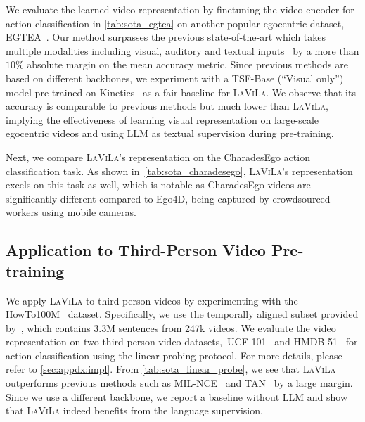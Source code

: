 \documentclass[10pt,twocolumn,letterpaper]{article}
\newcommand{\myparagraph}[1]{\vspace{0pt}\noindent{\bf #1}}
\newcommand{\ours}{\textsc{LaViLa}\xspace}
\newcommand{\charadesego}{CharadesEgo\xspace}
\begin{document}
\myparagraph{EGTEA.}
We evaluate the learned video representation by finetuning the video encoder for action classification in \cref{tab:sota_egtea} on another popular egocentric dataset, EGTEA~\cite{li2018egtea}.
Our method surpasses the previous state-of-the-art which takes multiple modalities including visual, auditory and textual inputs~\cite{kazakos2021little} by a more than $10\%$ absolute margin on the mean accuracy metric.
Since previous methods are based on different backbones, we experiment with a TSF-Base (``Visual only'') model pre-trained on Kinetics~\cite{carreira2017i3d} as a fair baseline for \ours.
We observe that its accuracy is comparable to previous methods but much lower than \ours, implying the effectiveness of learning visual representation on large-scale egocentric videos and using LLM as textual supervision during pre-training.



\myparagraph{\charadesego.} Next, we compare \ours's representation on the \charadesego action classification task. As shown in~\cref{tab:sota_charadesego}, \ours's representation excels on this task as well, which is notable as CharadesEgo videos are significantly different compared to Ego4D, being captured by crowdsourced workers using mobile cameras.




\subsection{Application to Third-Person Video Pre-training}
\label{sec:expt:third_person}

We apply \ours to third-person videos by experimenting with the HowTo100M~\cite{miech2019howto100m} dataset.
Specifically, we use the temporally aligned subset provided by~\cite{han2022tan}, which contains 3.3M sentences from 247k videos.
We evaluate the video representation on two third-person video datasets,~\ie UCF-101~\cite{soomro2012ucf101} and HMDB-51~\cite{kuehne2011hmdb} for action classification using the linear probing protocol.
For more details, please refer to \cref{sec:appdx:impl}.
From \cref{tab:sota_linear_probe}, we see that \ours outperforms previous methods such as MIL-NCE~\cite{miech2020milnce} and TAN~\cite{han2022tan} by a large margin.
Since we use a different backbone, we report a baseline without LLM and show that \ours indeed benefits from the language supervision.
\end{document}
